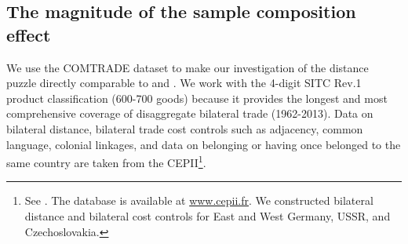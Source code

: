 \documentclass[12pt,twoside,a4paper,notitlepage]{article}
\begin{document}
 

\subsection{The magnitude of the sample composition effect} \label{subsec:data}
We use the COMTRADE dataset to make our investigation of the distance puzzle directly comparable to \cite{Head2013} and \cite{Berthelon2008}.
We work with the 4-digit SITC Rev.1 product classification (600-700 goods) because it provides the longest and most comprehensive coverage of disaggregate bilateral trade (1962-2013).
Data on bilateral distance, bilateral trade cost controls such as adjacency, common language, colonial linkages, and data on belonging or having once belonged to the same country are taken from the CEPII\footnote{See \cite{Mayer2011}.
The database is available at \url{www.cepii.fr}.
We constructed bilateral distance and bilateral cost controls for East and West Germany, USSR, and Czechoslovakia.}.
\end{document}
